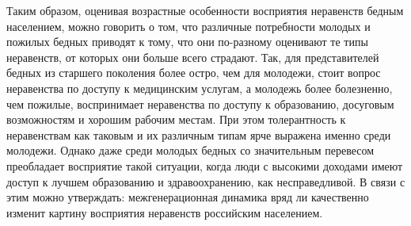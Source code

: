Таким образом, оценивая возрастные особенности восприятия неравенств бедным 
населением, можно говорить о том, что различные потребности молодых и пожилых 
бедных приводят к тому, что они по-разному оценивают те типы неравенств, от 
которых они больше всего страдают. Так, для представителей бедных из старшего 
поколения более остро, чем для молодежи, стоит вопрос неравенства по доступу 
к медицинским услугам, а молодежь более болезненно, чем пожилые, воспринимает 
неравенства по доступу к образованию, досуговым возможностям и хорошим рабочим 
местам. При этом толерантность к неравенствам как таковым и их различным типам 
ярче выражена именно среди молодежи. Однако даже среди молодых бедных со 
значительным перевесом преобладает восприятие такой ситуации, когда люди с 
высокими доходами имеют доступ к лучшем образованию и здравоохранению, как 
несправедливой. В связи с этим можно утверждать: межгенерационная динамика 
вряд ли качественно изменит картину восприятия неравенств российским 
населением.
